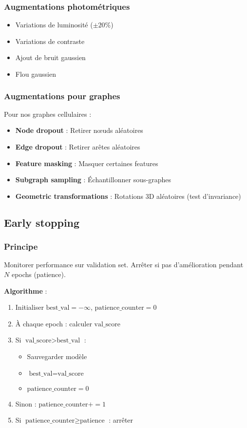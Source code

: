 \subsubsection{Augmentations photométriques}

\begin{itemize}
    \item Variations de luminosité ($\pm 20\%$)
    \item Variations de contraste
    \item Ajout de bruit gaussien
    \item Flou gaussien
\end{itemize}

\subsubsection{Augmentations pour graphes}

Pour nos graphes cellulaires :
\begin{itemize}
    \item \textbf{Node dropout} : Retirer nœuds aléatoires
    \item \textbf{Edge dropout} : Retirer arêtes aléatoires
    \item \textbf{Feature masking} : Masquer certaines features
    \item \textbf{Subgraph sampling} : Échantillonner sous-graphes
    \item \textbf{Geometric transformations} : Rotations 3D aléatoires (test d'invariance)
\end{itemize}

\subsection{Early stopping}

\subsubsection{Principe}

Monitorer performance sur validation set. Arrêter si pas d'amélioration pendant $N$ epochs (patience).

\textbf{Algorithme} :
\begin{enumerate}
    \item Initialiser $\text{best\_val} = -\infty$, $\text{patience\_counter} = 0$
    \item À chaque epoch : calculer $\text{val\_score}$
    \item Si $\text{val\_score} > \text{best\_val}$ :
        \begin{itemize}
            \item Sauvegarder modèle
            \item $\text{best\_val} = \text{val\_score}$
            \item $\text{patience\_counter} = 0$
        \end{itemize}
    \item Sinon : $\text{patience\_counter} += 1$
    \item Si $\text{patience\_counter} \geq \text{patience}$ : arrêter
\end{enumerate}

